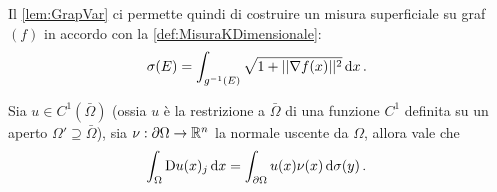 Il \cref{lem:GrapVar} ci permette quindi di costruire un misura superficiale su graf$(f)$ in accordo con la \cref{def:MisuraKDimensionale}:
\begin{equation}\label{equ:MisuraSuperficialeGrafico}
	\sigma(E)=\int_{g^{-1}(E)} \sqrt{1+||\nabla f(x)||^2} \,\mathrm d x\, \text{. }
\end{equation}


\begin{proposition}\label{prop:FormulaStokes}
	Sia $u\in C^1(\bar \Omega)$ (ossia $u$ è la restrizione a $\bar \Omega$ di una funzione $C^1$ definita su un aperto
	$\Omega'\supseteq \bar \Omega$), sia $\nu:\partial \Omega \rightarrow \mathbb R^n$ la normale uscente da $\Omega$, allora vale che
	\begin{equation}\label{equ:FormulaStokes}
		\int_{\Omega} \mathrm D u(x)_j \,\mathrm d x = \int_{\partial \Omega} u(x)\nu(x) \,\mathrm d \sigma(y)\, \text{. }
	\end{equation}
\end{proposition}


